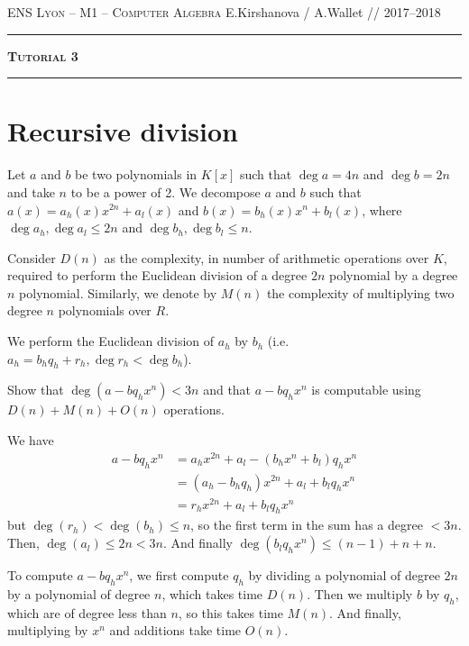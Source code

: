 \documentclass[11pt]{exam}
\theoremstyle{definition}
\begin{document}
{\noindent
   \textsc{ENS Lyon --  M1 -- Computer Algebra}
   \hfill { E.Kirshanova / A.Wallet // 2017--2018\\
  }
  \hrule
  \begin{center}
    {\Large\textbf{
   \textsc{Tutorial 3}
    } } 
  \end{center}
  \hrule \vspace{5mm}

\thispagestyle{empty}

\vspace{0.2cm}

\section{Recursive division}
Let $a$ and $b$ be two polynomials in $K[x]$ such that $\deg a=4n$ and $\deg b = 2n$ and take $n$ to be a power of 2. We decompose $a$ and $b$ such that $a(x)=a_h(x)x^{2n}+a_l(x)$ and $b(x)=b_h(x)x^{n}+b_l(x)$, where $\deg a_h, \deg a_l \leqslant 2n$ and $\deg b_h, \deg b_l \leqslant n$.

Consider $D(n)$ as the complexity, in number of arithmetic operations over $K$, required to perform the Euclidean division of a degree $2n$ polynomial by a degree $n$ polynomial. Similarly, we denote by $M(n)$ the complexity of multiplying two degree $n$ polynomials over $R$.

We perform the Euclidean division of $a_h$ by $b_h$ (i.e. $a_h=b_hq_h+r_h, \deg r_h < \deg b_h$).

\begin{questions}
	\question Show that $\deg(a-bq_hx^n)<3n$ and that $a-bq_hx^n$ is computable using $D(n)+M(n)+O(n)$ operations.
	\begin{solution}
		We have
		\begin{align*}
		a - b q_h x^n &=
		a_h x^{2n} + a_l - (b_h x^n + b_l) q_h x^n \\
		&= (a_h - b_h q_h) x^{2n} + a_l + b_l q_h x^n\\
		&= r_h x^{2n} + a_l + b_l q_h x^n
		\end{align*}
		but $\deg(r_h) < \deg(b_h) \leq n$, so the first term in the sum has a degree $< 3n$. Then, $\deg(a_l) \leq 2n < 3n$. And finally $\deg(b_l q_h x^n) \leq (n-1) + n + n$.
		
		To compute $a - b q_h x^n$, we first compute $q_h$ by dividing a polynomial of degree $2n$ by a polynomial of degree $n$, which takes time $D(n)$. Then we multiply $b$ by $q_h$, which are of degree less than $n$, so this takes time $M(n)$. And finally, multiplying by $x^n$ and additions take time $O(n)$.
	\end{solution}
	

\end{questions}}
\end{document}
